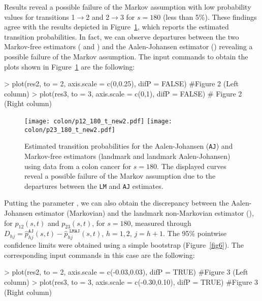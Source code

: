 Results reveal a possible failure of the Markov assumption with low probability values for transitions 1$\rightarrow$2 and 2$\rightarrow$3 for $s=180$ (less than 5\%). These findings agree with the results depicted in Figure~\ref{fig4}, which reports the estimated transition probabilities. In fact, we can observe departures between the two Markov-free estimators ( and ) and the Aalen-Johansen estimator () revealing a possible failure of the Markov assumption. The input commands to obtain the plots shown in Figure~\ref{fig4} are the following:

\begin{example}
> plot(res2, to = 2, axis.scale = c(0,0.25), difP = FALSE) #Figure 2 (Left column)
> plot(res3, to = 3, axis.scale = c(0,1), difP = FALSE) # Figure 2 (Right column)
\end{example}

 
\begin{figure} [t] %
\centering
\texttt{[image: colon/p12\_180\_t\_new2.pdf]}
\texttt{[image: colon/p23\_180\_t\_new2.pdf]}\\

\caption{\label{fig4} Estimated transition probabilities for the Aalen-Johansen (\texttt{AJ}) and Markov-free estimators (landmark and landmark Aalen-Johansen) using data from a colon cancer for  $s = 180$. The displayed curves reveal a possible failure of the Markov assumption due to the departures between the \texttt{LM} and \texttt{AJ} estimates.}
\end{figure}

Putting the parameter , we can also obtain the discrepancy between the Aalen-Johansen estimator (Markovian) and the landmark non-Markovian estimator (), for $p_{12}(s,t)$ and $p_{23}(s,t)$, for $s=180$, measured through $D_{hj}=\widehat p_{hj}^{\texttt{AJ}}(s,t)-\widehat p_{hj}^{\texttt{ LMAJ}}(s,t)$, $h=1,2$, $j=h+1$. The 95\% pointwise confidence limits were obtained using a simple bootstrap (Figure~\ref{fig6}). The corresponding input commands in this case are the following:

\begin{example}
> plot(res2, to = 2, axis.scale = c(-0.03,0.03), difP = TRUE) #Figure 3 (Left column)
> plot(res3, to = 3, axis.scale = c(-0.30,0.10), difP = TRUE) #Figure 3 (Right column)
\end{example}


